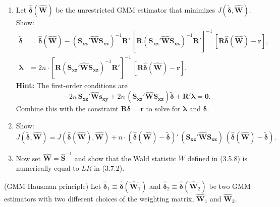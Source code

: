 \begin{problemset}
\begin{enumerate}[label=(\alph*)]
\item Let $\hat{\boldsymbol{\delta}}(\hat{\mathbf{W}})$ be the unrestricted GMM estimator that minimizes
  $J(\tilde{\boldsymbol{\delta}}, \hat{\mathbf{W}})$.  Show:
  \begin{align*}
    \tilde{\boldsymbol{\delta}}
    &= \hat{\boldsymbol{\delta}}(\hat{\mathbf{W}})
    - (\mathbf{S}_{\mathbf{xz}}' \hat{\mathbf{W}} \mathbf{S}_{\mathbf{xz}})^{-1}
    \mathbf{R}'\,
    [\mathbf{R}(\mathbf{S}_{\mathbf{xz}}' \hat{\mathbf{W}} \mathbf{S}_{\mathbf{xz}})^{-1}
    \mathbf{R}']^{-1}\,
    [\mathbf{R}\hat{\boldsymbol{\delta}}(\hat{\mathbf{W}}) - \mathbf{r}], \\
    \boldsymbol{\lambda}
    &= 2n \cdot
    [\mathbf{R}(\mathbf{S}_{\mathbf{xz}}' \hat{\mathbf{W}} \mathbf{S}_{\mathbf{xz}})^{-1}
    \mathbf{R}']^{-1}\,
    [\mathbf{R}\hat{\boldsymbol{\delta}}(\hat{\mathbf{W}}) - \mathbf{r}].
  \end{align*}
  \textbf{Hint:} The first-order conditions are
  \[
    -2n\, \mathbf{S}_{\mathbf{xz}}' \hat{\mathbf{W}} \mathbf{s}_{\mathbf{xy}}
    + 2n\, (\mathbf{S}_{\mathbf{xz}}' \hat{\mathbf{W}} \mathbf{S}_{\mathbf{xz}})
    \tilde{\boldsymbol{\delta}} + \mathbf{R}'\boldsymbol{\lambda} = \mathbf{0}.
  \]
  Combine this with the constraint $\mathbf{R}\tilde{\boldsymbol{\delta}} = \mathbf{r}$ to solve for
  $\boldsymbol{\lambda}$ and $\tilde{\boldsymbol{\delta}}$.

\item Show:
  \[
    J(\tilde{\boldsymbol{\delta}}, \hat{\mathbf{W}})
    = J(\hat{\boldsymbol{\delta}}(\hat{\mathbf{W}}), \hat{\mathbf{W}})
    + n \cdot (\hat{\boldsymbol{\delta}}(\hat{\mathbf{W}}) - \tilde{\boldsymbol{\delta}})'\,
    (\mathbf{S}_{\mathbf{xz}}' \hat{\mathbf{W}} \mathbf{S}_{\mathbf{xz}})\,
    (\hat{\boldsymbol{\delta}}(\hat{\mathbf{W}}) - \tilde{\boldsymbol{\delta}}).
  \]

\item Now set $\hat{\mathbf{W}} = \hat{\mathbf{S}}^{-1}$ and show that the Wald statistic $W$
  defined in (3.5.8) is numerically equal to $LR$ in (3.7.2).
\end{enumerate}

\exercise[9]
(GMM Hausman principle) Let
$\hat{\boldsymbol{\delta}}_1 \equiv \hat{\boldsymbol{\delta}}(\hat{\mathbf{W}}_1)$ and
$\hat{\boldsymbol{\delta}}_2 \equiv \hat{\boldsymbol{\delta}}(\hat{\mathbf{W}}_2)$ be two GMM
estimators with two different choices of the weighting matrix, $\hat{\mathbf{W}}_1$ and
$\hat{\mathbf{W}}_2$.


\end{problemset}
